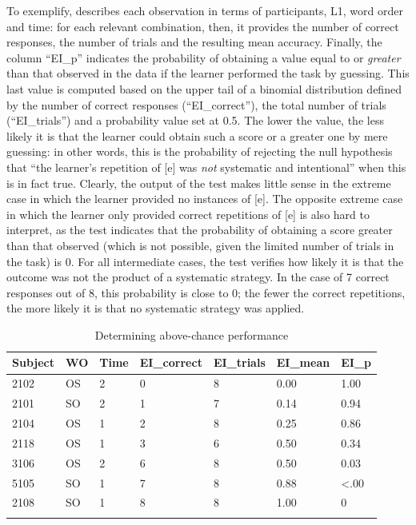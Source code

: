 To exemplify,  describes each observation in terms of participants, L1, word order and time: for each relevant combination, then, it provides the number of correct responses, the number of trials and the resulting mean accuracy. Finally, the column “EI\_p” indicates the probability of obtaining a value equal to or \textit{greater} than that observed in the data if the learner performed the task by guessing. This last value is computed based on the upper tail of a binomial distribution defined by the number of correct responses (“EI\_correct”), the total number of trials (“EI\_trials”) and a probability value set at 0.5. The lower the value, the less likely it is that the learner could obtain such a score or a greater one by mere guessing: in other words, this is the probability of rejecting the null hypothesis that “the learner’s repetition of [e] was \textit{not} systematic and intentional” when this is in fact true. Clearly, the output of the test makes little sense in the extreme case in which the learner provided no instances of [e]. The opposite extreme case in which the learner only provided correct repetitions of [e] is also hard to interpret, as the test indicates that the probability of obtaining a score greater than that observed (which is not possible, given the limited number of trials in the task) is 0. For all intermediate cases, the test verifies how likely it is that the outcome was not the product of a systematic strategy. In the case of 7 correct responses out of 8, this probability is close to 0; the fewer the correct repetitions, the more likely it is that no systematic strategy was applied.

\begin{table}
    \begin{tabularx}{\textwidth}{XXXXXXX}
    \lsptoprule
     Subject & WO & Time & EI\_correct & EI\_trials & EI\_mean & EI\_p\\
     \midrule
     2102 & OS & 2 & 0 & 8 & 0.00 & 1.00\\
     2101 & SO & 2 & 1 & 7 & 0.14 & 0.94\\
     2104 & OS & 1 & 2 & 8 & 0.25 & 0.86\\
     2118 & OS & 1 & 3 & 6 & 0.50 & 0.34\\
     3106 & OS & 2 & 6 & 8 & 0.50 & 0.03\\
     5105 & SO & 1 & 7 & 8 & 0.88 & <.00\\
     2108 & SO & 1 & 8 & 8 & 1.00 & 0\\
    \lspbottomrule
    \end{tabularx}
    \caption{Determining above-chance performance}
    \label{tab:04:6}
\end{table}

